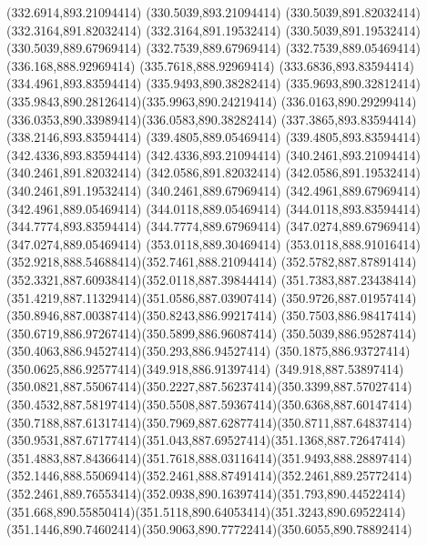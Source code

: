 {{	\lineto(332.6914,893.21094414)
	\lineto(330.5039,893.21094414)
	\lineto(330.5039,891.82032414)
	\lineto(332.3164,891.82032414)
	\lineto(332.3164,891.19532414)
	\lineto(330.5039,891.19532414)
	\lineto(330.5039,889.67969414)
	\lineto(332.7539,889.67969414)
	\lineto(332.7539,889.05469414)
	\closepath
	\moveto(336.168,888.92969414)
	\lineto(335.7618,888.92969414)
	\lineto(333.6836,893.83594414)
	\lineto(334.4961,893.83594414)
	\lineto(335.9493,890.38282414)
	\curveto(335.9693,890.32812414)(335.9843,890.28126414)(335.9963,890.24219414)
	\curveto(336.0163,890.29299414)(336.0353,890.33989414)(336.0583,890.38282414)
	\lineto(337.3865,893.83594414)
	\lineto(338.2146,893.83594414)
	\closepath
	\moveto(339.4805,889.05469414)
	\lineto(339.4805,893.83594414)
	\lineto(342.4336,893.83594414)
	\lineto(342.4336,893.21094414)
	\lineto(340.2461,893.21094414)
	\lineto(340.2461,891.82032414)
	\lineto(342.0586,891.82032414)
	\lineto(342.0586,891.19532414)
	\lineto(340.2461,891.19532414)
	\lineto(340.2461,889.67969414)
	\lineto(342.4961,889.67969414)
	\lineto(342.4961,889.05469414)
	\closepath
	\moveto(344.0118,889.05469414)
	\lineto(344.0118,893.83594414)
	\lineto(344.7774,893.83594414)
	\lineto(344.7774,889.67969414)
	\lineto(347.0274,889.67969414)
	\lineto(347.0274,889.05469414)
	\closepath
	\moveto(353.0118,889.30469414)
	\curveto(353.0118,888.91016414)(352.9218,888.54688414)(352.7461,888.21094414)
	\curveto(352.5782,887.87891414)(352.3321,887.60938414)(352.0118,887.39844414)
	\curveto(351.7383,887.23438414)(351.4219,887.11329414)(351.0586,887.03907414)
	\curveto(350.9726,887.01957414)(350.8946,887.00387414)(350.8243,886.99217414)
	\curveto(350.7503,886.98417414)(350.6719,886.97267414)(350.5899,886.96087414)
	\curveto(350.5039,886.95287414)(350.4063,886.94527414)(350.293,886.94527414)
	\curveto(350.1875,886.93727414)(350.0625,886.92577414)(349.918,886.91397414)
	\lineto(349.918,887.53897414)
	\curveto(350.0821,887.55067414)(350.2227,887.56237414)(350.3399,887.57027414)
	\curveto(350.4532,887.58197414)(350.5508,887.59367414)(350.6368,887.60147414)
	\curveto(350.7188,887.61317414)(350.7969,887.62877414)(350.8711,887.64837414)
	\curveto(350.9531,887.67177414)(351.043,887.69527414)(351.1368,887.72647414)
	\curveto(351.4883,887.84366414)(351.7618,888.03116414)(351.9493,888.28897414)
	\curveto(352.1446,888.55069414)(352.2461,888.87491414)(352.2461,889.25772414)
	\curveto(352.2461,889.76553414)(352.0938,890.16397414)(351.793,890.44522414)
	\curveto(351.668,890.55850414)(351.5118,890.64053414)(351.3243,890.69522414)
	\curveto(351.1446,890.74602414)(350.9063,890.77722414)(350.6055,890.78892414)
}}
